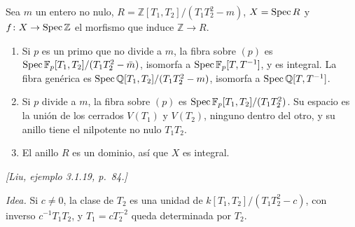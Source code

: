 \begin{ejem}[La familia \(T_1T_2^2=m\)]
\label{ejem:s11-familia-nilpotentes}
Sea \(m\) un entero no nulo, \(R=\mathbb Z[T_1,T_2]/(T_1T_2^2-m)\), \(X=\operatorname{Spec} R\) y \(f\colon X\to\operatorname{Spec}\mathbb Z\) el morfismo que induce \(\mathbb Z\to R\).
\begin{enumerate}[label=(\roman*)]
\item Si \(p\) es un primo que no divide a \(m\), la fibra sobre \((p)\) es \(\operatorname{Spec}\mathbb F_p[T_1,T_2]/(T_1T_2^2-\bar m)\), isomorfa a \(\operatorname{Spec}\mathbb F_p[T,T^{-1}]\), y es integral. La fibra genérica es \(\operatorname{Spec}\mathbb Q[T_1,T_2]/(T_1T_2^2-m)\), isomorfa a \(\operatorname{Spec}\mathbb Q[T,T^{-1}]\).
\item Si \(p\) divide a \(m\), la fibra sobre \((p)\) es \(\operatorname{Spec}\mathbb F_p[T_1,T_2]/(T_1T_2^2)\). Su espacio es la unión de los cerrados \(V(T_1)\) y \(V(T_2)\), ninguno dentro del otro, y su anillo tiene el nilpotente no nulo \(T_1T_2\).
\item El anillo \(R\) es un dominio, así que \(X\) es integral.
\end{enumerate}
\emph{[Liu, ejemplo 3.1.19, p.~84.]}
\end{ejem}

\emph{Idea.} Si \(c\ne0\), la clase de \(T_2\) es una unidad de \(k[T_1,T_2]/(T_1T_2^2-c)\), con inverso \(c^{-1}T_1T_2\), y \(T_1=cT_2^{-2}\) queda determinada por \(T_2\).

